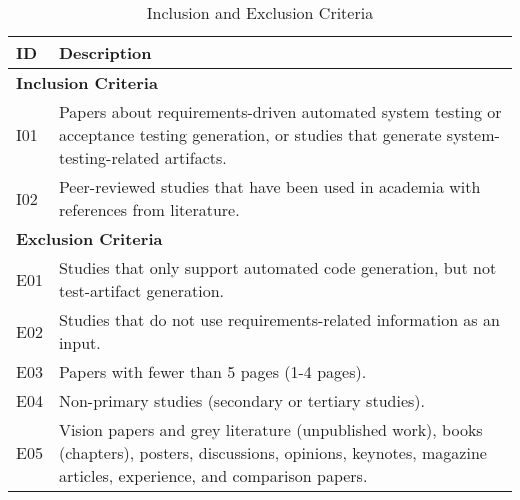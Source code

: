 \begin{table*}[]
\small
\caption{Inclusion and Exclusion Criteria}
\label{table:criteria}
\begin{tabularx}{\textwidth}{lX}
\hline
\textbf{ID}  & \textbf{Description} \\ \hline
\multicolumn{2}{l}{\textbf{Inclusion Criteria}} \\ \hline
I01 & Papers about requirements-driven automated system testing or acceptance testing generation, or studies that generate system-testing-related artifacts. \\
I02 & Peer-reviewed studies that have been used in academia with references from literature. \\ \hline
\multicolumn{2}{l}{\textbf{Exclusion Criteria}} \\ \hline
E01 & Studies that only support automated code generation, but not test-artifact generation. \\
E02 & Studies that do not use requirements-related information as an input. \\
E03 & Papers with fewer than 5 pages (1-4 pages). \\
E04 & Non-primary studies (secondary or tertiary studies). \\
E05 & Vision papers and grey literature (unpublished work), books (chapters), posters, discussions, opinions, keynotes, magazine articles, experience, and comparison papers. \\ \hline
\end{tabularx}
\end{table*}